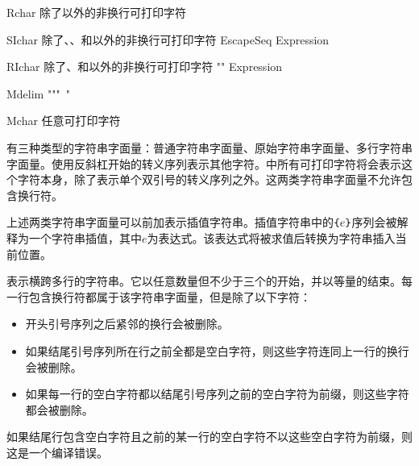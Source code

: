\begin{bnf}{Rchar}
    \textnormal{除了以外的非换行可打印字符} \br
\end{bnf}

\begin{bnf}{SIchar}
    \textnormal{除了\terminal{\textbackslash}、、\terminal{\{}和\terminal{\}}以外的非换行可打印字符} \br
    EscapeSeq \br
    \terminal{\{} Expression \terminal{\}} \br
    \terminal{\{\{} \br
    \terminal{\}\}}
\end{bnf}

\begin{bnf}{RIchar}
    \textnormal{除了、\terminal{\{}和\terminal{\}}以外的非换行可打印字符} \br
    "" \br
    \terminal{\{} Expression \terminal{\}} \br
    \terminal{\{\{} \br
    \terminal{\}\}}
\end{bnf}

\begin{bnf}{Mdelim}
    """\ "\bnfs
\end{bnf}

\begin{bnf}{Mchar}
    \textnormal{任意可打印字符}
\end{bnf}

\pnum
有三种类型的字符串字面量：普通字符串字面量、原始字符串字面量、多行字符串字面量。使用反斜杠开始的转义序列表示其他字符。中所有可打印字符将会表示这个字符本身，除了表示单个双引号的转义序列之外。这两类字符串字面量不允许包含换行符。

\pnum
上述两类字符串字面量可以前加\tcode{\$}表示插值字符串。插值字符串中的$\texttt{\{}e\texttt{\}}$序列会被解释为一个字符串插值，其中$e$为表达式。该表达式将被求值后转换为字符串插入当前位置。

\pnum
{}表示横跨多行的字符串。它以任意数量但不少于三个的开始，并以等量的结束。每一行包含换行符都属于该字符串字面量，但是除了以下字符：

\begin{itemize}
    \item 开头引号序列之后紧邻的换行会被删除。
    \item 如果结尾引号序列所在行之前全都是空白字符，则这些字符连同上一行的换行会被删除。
    \item 如果每一行的空白字符都以结尾引号序列之前的空白字符为前缀，则这些字符都会被删除。
\end{itemize}

如果结尾行包含空白字符且之前的某一行的空白字符不以这些空白字符为前缀，则这是一个编译错误。

